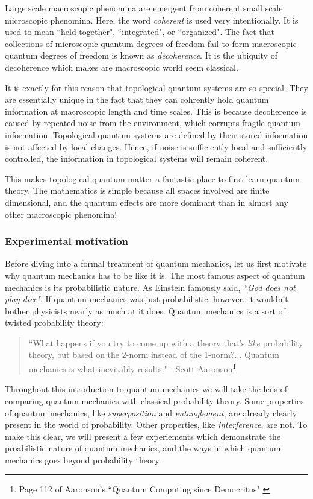\documentclass{article}
\theoremstyle{definition}
\newcommand{\0}{\left|0\right>}
\newcommand{\1}{\left|1\right>}
\numberwithin{figure}{section}
\begin{document}
Large scale macroscopic phenomina are emergent from coherent small scale microscopic phenomina. Here, the word \textit{coherent} is used very intentionally. It is used to mean ``held together", ``integrated", or ``organized". The fact that collections of microscopic quantum degrees of freedom fail to form macroscopic quantum degrees of freedom is known as \textit{decoherence}. It is the ubiquity of decoherence which makes are macroscopic world seem classical.

It is exactly for this reason that topological quantum systems are so special. They are essentially unique in the fact that they can cohrently hold quantum information at macroscopic length and time scales. This is because decoherence is caused by repeated noise from the environment, which corrupts fragile quantum information. Topological quantum systems are defined by their stored information is not affected by local changes. Hence, if noise is sufficiently local and sufficiently controlled, the information in topological systems will remain coherent. 

This makes topological quantum matter a fantastic place to first learn quantum theory. The mathematics is simple because all spaces involved are finite dimensional, and the quantum effects are more dominant than in almost any other macroscopic phenomina!

\subsubsection{Experimental motivation}

Before diving into a formal treatment of quantum mechanics, let us first motivate why quantum mechanics has to be like it is. The most famous aspect of quantum mechanics is its probabilistic nature. As Einstein famously said, \textit{``God does not play dice"}. If quantum mechanics was just probabilistic, however, it wouldn't bother physicists nearly as much at it does. Quantum mechanics is a sort of twisted probability theory:

\begin{quote}
``What happens if you try to come up with a theory that's \textit{like} probability theory, but based on the $2$-norm instead of the $1$-norm?... Quantum mechanics is what inevitably results." - Scott Aaronson\footnote{Page 112 of Aaronson's ``Quantum Computing since Democritus" \cite{aaronson2013quantum}}
\end{quote}

Throughout this introduction to quantum mechanics we will take the lens of comparing quantum mechanics with classical probability theory. Some properties of quantum mechanics, like \textit{superposition} and \textit{entanglement}, are already clearly present in the world of probability. Other properties, like \textit{interference}, are not. To make this clear, we will present a few experiements which demonstrate the proabilistic nature of quantum mechanics, and the ways in which quantum mechanics goes beyond probability theory.
\end{document}
